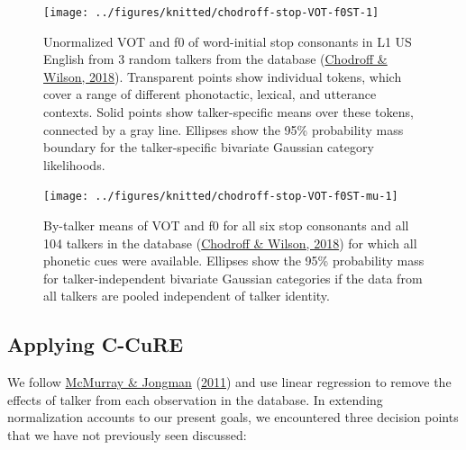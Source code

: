 \documentclass[
  11pt,
  english,
  man,floatsintext]{apa6}
\begin{document}
\begin{figure}

{\centering \texttt{[image: ../figures/knitted/chodroff-stop-VOT-f0ST-1]} 

}

\caption{Unormalized VOT and f0 of word-initial stop consonants in L1 US English from 3 random talkers from the database (\protect\hyperlink{ref-chodroff-wilson2018}{Chodroff \& Wilson, 2018}). Transparent points show individual tokens, which cover a range of different phonotactic, lexical, and utterance contexts. Solid points show talker-specific means over these tokens, connected by a gray line. Ellipses show the 95\% probability mass boundary for the talker-specific bivariate Gaussian category likelihoods.}\label{fig:chodroff-stop-VOT-f0ST}
\end{figure}



\begin{figure}

{\centering \texttt{[image: ../figures/knitted/chodroff-stop-VOT-f0ST-mu-1]} 

}

\caption{By-talker means of VOT and f0 for all six stop consonants and all 104 talkers in the database (\protect\hyperlink{ref-chodroff-wilson2018}{Chodroff \& Wilson, 2018}) for which all phonetic cues were available. Ellipses show the 95\% probability mass for talker-independent bivariate Gaussian categories if the data from all talkers are pooled independent of talker identity.}\label{fig:chodroff-stop-VOT-f0ST-mu}
\end{figure}

\hypertarget{applying-c-cure}{%
\subsection{Applying C-CuRE}\label{applying-c-cure}}

We follow \protect\hyperlink{ref-mcmurray-jongman2011}{McMurray \& Jongman} (\protect\hyperlink{ref-mcmurray-jongman2011}{2011}) and use linear regression to remove the effects of talker from each observation in the database. In extending normalization accounts to our present goals, we encountered three decision points that we have not previously seen discussed:
\end{document}
